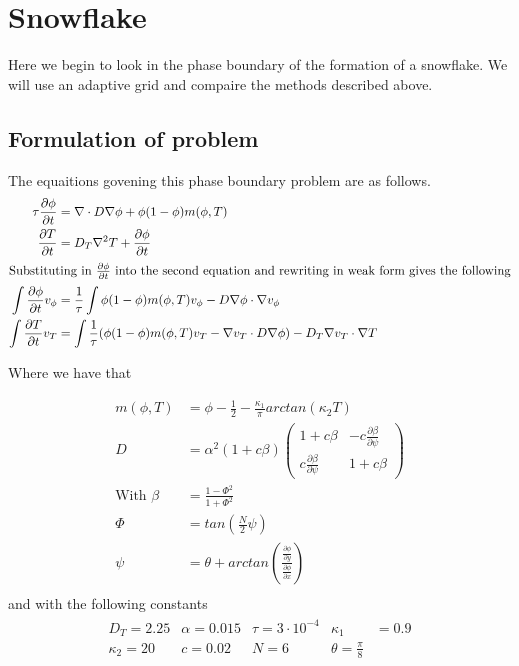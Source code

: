 \section {Snowflake}
Here we begin to look in the phase boundary of the formation of a snowflake.
We will use an adaptive grid and compaire the methods described above.
\subsection{Formulation of problem}

The equaitions govening this phase boundary problem are as follows.
\begin{align*}
    \tau \frac{\partial \phi}{\partial t} &= \nabla \cdot D\nabla\phi +  \phi(1-\phi)m(\phi,T)\\
    \frac{\partial T}{\partial t} &= D_T \nabla ^2T + \frac{\partial \phi}{\partial t}\\
    \intertext{Substituting in $\frac{\partial \phi}{\partial t}$ into the second equation and rewriting in weak form gives the following}
    \int \frac{\partial \phi}{\partial t} v_{\phi} &=  \frac 1{\tau}\int \phi(1-\phi)m(\phi,T)v_{\phi} - D \nabla \phi \cdot \nabla v_{\phi}\\
    \int \frac{\partial T}{\partial t} v_T &= \int \frac 1{\tau}(\phi(1-\phi)m(\phi,T)v_T - \nabla v_T \cdot D \nabla \phi) - D_T \nabla v_T \cdot \nabla T
\end{align*}

Where we have that

\begin{align*}
    m(\phi, T) &= \phi - \frac 12 - \frac{\kappa_1}{\pi}arctan(\kappa_2 T)\\
    D &= \alpha^2(1+c\beta)
    \begin{pmatrix}
        1+c\beta & -c\frac{\partial\beta}{\partial\psi}\\
        c\frac{\partial\beta}{\partial\psi} & 1+c\beta
    \end{pmatrix}\\
    \text{With }\beta &= \frac{1-\Phi^2}{1+\Phi^2}\\
    \Phi &= tan(\frac N2\psi)\\
    \psi &= \theta + arctan(\frac{\frac{\partial \phi}{\partial y}}{\frac{\partial \phi}{\partial x}})\\
\end{align*}
and with the following constants
\begin{align*}
    \begin{matrix}
    D_T = 2.25 & \alpha = 0.015 & \tau = 3\cdot 10^{-4} & \kappa_1 &= 0.9\\
    \kappa_2 = 20 & c = 0.02 & N = 6 & \theta = \frac{\pi}8
    \end{matrix}
\end{align*}


